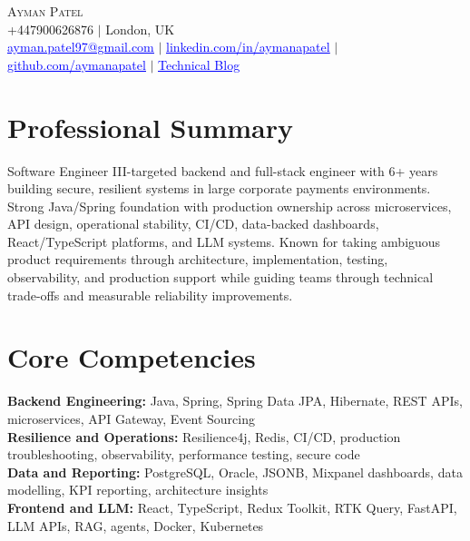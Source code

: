 \documentclass[letterpaper,11pt]{article}
\newcommand{\headerLink}[2]{\href{#1}{\textcolor{blue}{\underline{#2}}}}
\begin{document}
    \begin{center}
        {\Huge\scshape Ayman Patel}
        \\ +447900626876 $|$ London, UK\\
        \small
        \headerLink{mailto:ayman.patel97@gmail.com}{ayman.patel97@gmail.com} $|$
        \headerLink{https://linkedin.com/in/aymanapatel}{linkedin.com/in/aymanapatel} $|$
        \headerLink{https://github.com/aymanapatel}{github.com/aymanapatel} $|$
        \headerLink{https://aymanace2049.hashnode.dev}{Technical Blog}
    \end{center}

\section{Professional Summary}
\small{
Software Engineer III-targeted backend and full-stack engineer with 6+ years building secure, resilient systems in large corporate payments environments. Strong Java/Spring foundation with production ownership across microservices, API design, operational stability, CI/CD, data-backed dashboards, React/TypeScript platforms, and LLM systems. Known for taking ambiguous product requirements through architecture, implementation, testing, observability, and production support while guiding teams through technical trade-offs and measurable reliability improvements.
}
\vspace{2pt}

\section{Core Competencies}
\vspace{-7pt}
\begin{itemize}[leftmargin=0.15in, label={}]\small{\item{
\textbf{Backend Engineering:} Java, Spring, Spring Data JPA, Hibernate, REST APIs, microservices, API Gateway, Event Sourcing \\
\textbf{Resilience and Operations:} Resilience4j, Redis, CI/CD, production troubleshooting, observability, performance testing, secure code \\
\textbf{Data and Reporting:} PostgreSQL, Oracle, JSONB, Mixpanel dashboards, data modelling, KPI reporting, architecture insights \\
\textbf{Frontend and LLM:} React, TypeScript, Redux Toolkit, RTK Query, FastAPI, LLM APIs, RAG, agents, Docker, Kubernetes
}}
\end{itemize}
\end{document}
